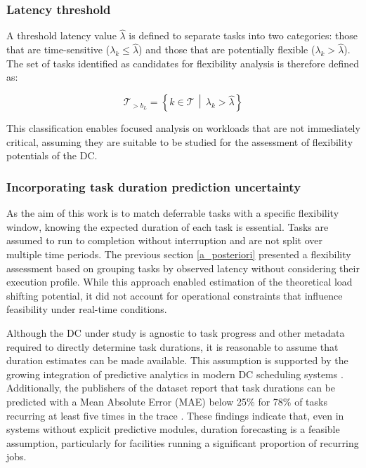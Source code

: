 \documentclass[preprint,12pt]{elsarticle}
\begin{document}
\subsubsection{Latency threshold}

A threshold latency value $\hat{\lambda}$ is defined to separate tasks into two categories: those that are time-sensitive ($\lambda_k \leq \hat{\lambda}$) and those that are potentially flexible ($\lambda_k > \hat{\lambda}$). The set of tasks identified as candidates for flexibility analysis is therefore defined as:

\begin{equation}
\mathcal{T}_{>b_L} = \left\{ k \in \mathcal{T} \,\middle|\, \lambda_k > \hat{\lambda} \right\}
\end{equation}

This classification enables focused analysis on workloads that are not immediately critical, assuming they are suitable to be studied for the assessment of flexibility potentials of the DC.

\subsubsection{Incorporating task duration prediction uncertainty} \label{prediction_uncertainty_methods}
As the aim of this work is to match deferrable tasks with a specific flexibility window, knowing the expected duration of each task is essential. Tasks are assumed to run to completion without interruption and are not split over multiple time periods. 
The previous section \ref{a_posteriori} presented a flexibility assessment based on grouping tasks by observed latency without considering their execution profile. While this approach enabled estimation of the theoretical load shifting potential, it did not account for operational constraints that influence feasibility under real-time conditions.

Although the DC under study is agnostic to task progress and other metadata required to directly determine task durations, it is reasonable to assume that duration estimates can be made available. This assumption is supported by the growing integration of predictive analytics in modern DC scheduling systems \cite{Hu2021, Yeung2022, Amaris2016, Kawaguchi2024}. Additionally, the publishers of the dataset report that task durations can be predicted with a %
Mean Absolute Error (MAE) below 25\% for 78\% of tasks recurring at least five times in the trace \cite{Weng2022}. These findings indicate that, even in systems without explicit predictive modules, duration forecasting is a feasible assumption, particularly for facilities running a significant proportion of recurring jobs.
\end{document}
